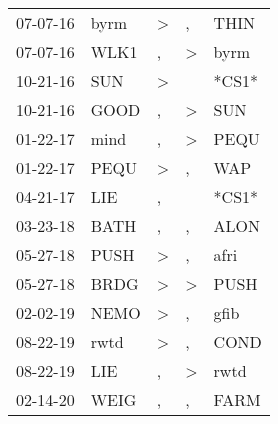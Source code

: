 \begin{supertabular}{lllll}
 07-07-16 &   byrm &  \textgreater &                , &   THIN \\
 07-07-16 &   WLK1 &             , &     \textgreater &   byrm \\
 10-21-16 &    SUN &  \textgreater &                  &  *CS1* \\
 10-21-16 &   GOOD &             , &     \textgreater &    SUN \\
 01-22-17 &   mind &             , &     \textgreater &   PEQU \\
 01-22-17 &   PEQU &  \textgreater &                , &    WAP \\
 04-21-17 &    LIE &             , &                  &  *CS1* \\
 03-23-18 &   BATH &             , &                , &   ALON \\
 05-27-18 &   PUSH &  \textgreater &                , &   afri \\
 05-27-18 &   BRDG &  \textgreater &     \textgreater &   PUSH \\
 02-02-19 &   NEMO &  \textgreater &                , &   gfib \\
 08-22-19 &   rwtd &  \textgreater &                , &   COND \\
 08-22-19 &    LIE &             , &     \textgreater &   rwtd \\
 02-14-20 &   WEIG &             , &                , &   FARM \\
\end{supertabular}
